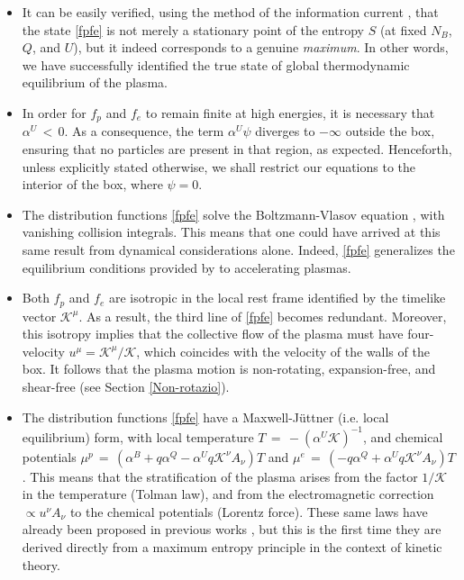 \documentclass[a4paper, amsfonts, amssymb, amsmath, reprint, showkeys, nofootinbib, twoside, onecolumn,notitlepage]{revtex4-1}
\newcommand{\K}{{\mathcal{K}}}
\theoremstyle{definition}
\theoremstyle{theorem}
\begin{document}
\begin{itemize}
\item It can be easily verified, using the method of the information current \cite{GavassinoGibbs2021}, that the state \eqref{fpfe} is not merely a stationary point of the entropy $S$ (at fixed $N_B$, $Q$, and $U$), but it indeed corresponds to a genuine \textit{maximum}. In other words, we have successfully identified the true state of global thermodynamic equilibrium of the plasma.
\item In order for $f_p$ and $f_e$ to remain finite at high energies, it is necessary that $\alpha^U\,{<}\,0$. As a consequence, the term $\alpha^U\psi$ diverges to $-\infty$ outside the box, ensuring that no particles are present in that region, as expected. Henceforth, unless explicitly stated otherwise, we shall restrict our equations to the interior of the box, where $\psi=0$.
\item The distribution functions \eqref{fpfe} solve the Boltzmann-Vlasov equation \cite[\S 2.1]{cercignani_book}, with vanishing collision integrals. This means that one could have arrived at this same result from dynamical considerations alone. Indeed, \eqref{fpfe} generalizes the equilibrium conditions provided by \cite[Ch. II, \S 4.a, Eq. (24)]{Groot1980RelativisticKT} to accelerating plasmas.
\item Both $f_p$ and $f_e$ are isotropic in the local rest frame identified by the timelike vector $\K^\mu$. As a result, the third line of \eqref{fpfe} becomes redundant. Moreover, this isotropy implies that the collective flow of the plasma must have four-velocity $u^\mu = \K^\mu / \K$, which coincides with the velocity of the walls of the box. It follows that the plasma motion is non-rotating, expansion-free, and shear-free (see Section \ref{Non-rotazio}).
\item The distribution functions \eqref{fpfe} have a Maxwell-J\"{u}ttner (i.e. local equilibrium) form, with local temperature $T\,{=}\,{-}(\alpha^U \K)^{-1}$, and chemical potentials $\mu^p\,{=}\,(\alpha^B{+}q\alpha^Q  {-}\alpha^U q\K^\nu A_\nu)T$ and $\mu^e\,{=}\,({-}q\alpha^Q  {+}\alpha^U q\K^\nu A_\nu)T$. This means that the stratification of the plasma arises from the factor $1/\K$ in the temperature (Tolman law), and from the electromagnetic correction $\propto u^\nu A_\nu$ to the chemical potentials (Lorentz force). These same laws have already been proposed in previous works \cite{Hernandez:2017mch,GavassinoShokryMHD:2023qnw}, but this is the first time they are derived directly from a maximum entropy principle in the context of kinetic theory.
\end{itemize}
 
\end{document}
